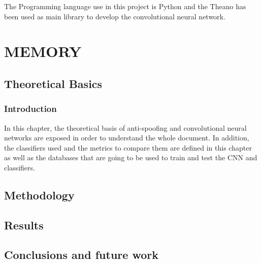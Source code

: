 \documentclass[12pt,a4paper,titlepage,twoside]{book}
\newcommand{\blankpage}{
\newpage \thispagestyle{empty}
\emph{  }
\newpage
}
\begin{document}
The Programming language use in this project is Python and the Theano has been used as main library to develop the convolutional neural network.\\

\tableofcontents %


\mainmatter
\part{MEMORY}
  

\chapter{Theoretical Basics}\label{theorics}
\section{Introduction}
In this chapter, the theoretical basis of anti-spoofing and convolutional neural networks are exposed in order to understand the whole document. In addition, the classifiers used and the metrics to compare them are defined in this chapter as well as the databases that are going to be used to train and test the CNN and classifiers.
  
  
  
  
  
  
  
  \chapter{Methodology} \label{ch:methodology}
  
  
\chapter{Results} \label{ch:results}
	
	
\chapter{Conclusions and future work} \label{ch:concl}
  
  




\fancyhead[RO]{} %
\listoffigures 	%
\blankpage
\listoftables
\blankpage
\end{document}
